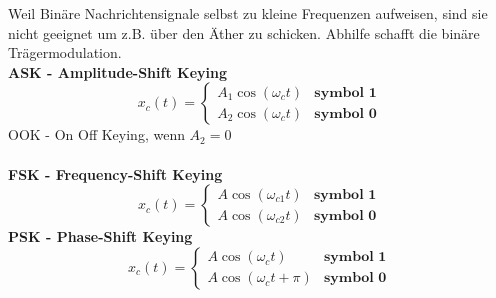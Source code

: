 \begin{minipage}{9cm}
	Weil Binäre Nachrichtensignale selbst zu kleine Frequenzen aufweisen, sind sie nicht geeignet um
	z.B. über den Äther zu schicken. Abhilfe schafft die binäre Trägermodulation. 
	\vspace{0.1cm}  \\
	\textbf{ASK - Amplitude-Shift Keying}
	\[x_c(t) = \begin{cases}
           A_1 \cos(\omega_c t) & \textbf{symbol 1} \\
           A_2 \cos(\omega_c t) & \textbf{symbol 0}
           \end{cases} \]
    OOK - On Off Keying, wenn $A_2 = 0$\\ \\
	\textbf{FSK - Frequency-Shift Keying}
	\[x_c(t) = \begin{cases}
           A \cos(\omega_{c1} t) & \textbf{symbol 1}     \\         
           A \cos(\omega_{c2} t) & \textbf{symbol 0}
           \end{cases} \]
	\textbf{PSK - Phase-Shift Keying} \\
	\[x_c(t) = \begin{cases}
           A \cos(\omega_{c} t) & \textbf{symbol 1}        \\      
           A \cos(\omega_{c} t + \pi) & \textbf{symbol 0}
           \end{cases}\] \\
\end{minipage}

